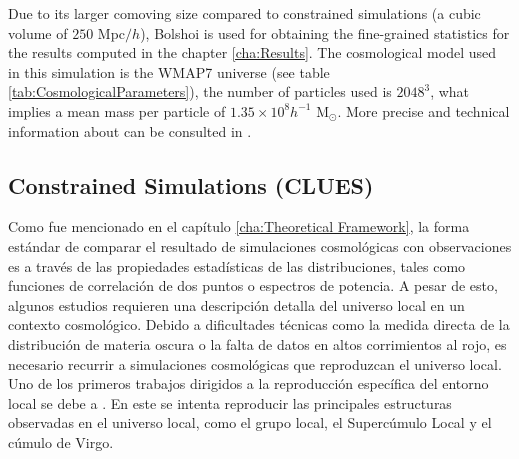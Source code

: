 Due to its larger comoving size compared to constrained simulations (a
cubic volume of $250$ Mpc$/h$), Bolshoi is used for obtaining the 
fine-grained statistics for the results computed in the chapter
\ref{cha:Results}. The cosmological model used in this simulation is the 
WMAP7 universe (see table \ref{tab:CosmologicalParameters}), the number of
particles used is $2048^3$, what implies a mean mass per particle of 
$1.35 \times 10^8 h^{-1}$ M$_{\odot}$. More precise and technical 
information about can be consulted in \cite{klypin2011}.
\newpage



	\subsection{Constrained Simulations (CLUES)}
	\label{subsec:ConstrainedSimulations}


Como fue mencionado en el capítulo \ref{cha:Theoretical Framework}, la forma
estándar de comparar el resultado de simulaciones cosmológicas con 
observaciones es a través de las propiedades estadísticas de las 
distribuciones, tales como funciones de correlación de dos puntos o 
espectros de potencia. A pesar de esto, algunos estudios requieren una 
descripción detalla del universo local en un contexto cosmológico. Debido 
a dificultades técnicas como la medida directa de la distribución de materia
oscura o la falta de datos en altos corrimientos al rojo, es necesario 
recurrir a simulaciones cosmológicas que reproduzcan el universo local.
Uno de los primeros trabajos dirigidos a la reproducción específica del
entorno local se debe a \cite{Klypin2003}. En este se intenta reproducir las 
principales estructuras observadas en el universo local, como el grupo local,
el Supercúmulo Local y el cúmulo de Virgo.



